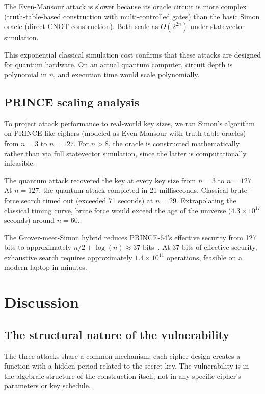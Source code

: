 \documentclass[11pt]{article}
\begin{document}
The Even-Mansour attack is slower because its oracle circuit is more complex (truth-table-based construction with multi-controlled gates) than the basic Simon oracle (direct CNOT construction). Both scale as $O(2^{2n})$ under statevector simulation.

This exponential classical simulation cost confirms that these attacks are designed for quantum hardware. On an actual quantum computer, circuit depth is polynomial in $n$, and execution time would scale polynomially.

\subsection{PRINCE scaling analysis}

To project attack performance to real-world key sizes, we ran Simon's algorithm on PRINCE-like ciphers (modeled as Even-Mansour with truth-table oracles) from $n=3$ to $n=127$. For $n > 8$, the oracle is constructed mathematically rather than via full statevector simulation, since the latter is computationally infeasible.

The quantum attack recovered the key at every key size from $n=3$ to $n=127$. At $n=127$, the quantum attack completed in 21 milliseconds. Classical brute-force search timed out (exceeded 71 seconds) at $n=29$. Extrapolating the classical timing curve, brute force would exceed the age of the universe ($4.3 \times 10^{17}$ seconds) around $n=60$.

The Grover-meet-Simon hybrid reduces PRINCE-64's effective security from 127 bits to approximately $n/2 + \log(n) \approx 37$ bits~\cite{leander2017}. At 37 bits of effective security, exhaustive search requires approximately $1.4 \times 10^{11}$ operations, feasible on a modern laptop in minutes.

\section{Discussion}

\subsection{The structural nature of the vulnerability}

The three attacks share a common mechanism: each cipher design creates a function with a hidden period related to the secret key. The vulnerability is in the algebraic structure of the construction itself, not in any specific cipher's parameters or key schedule.
\end{document}
